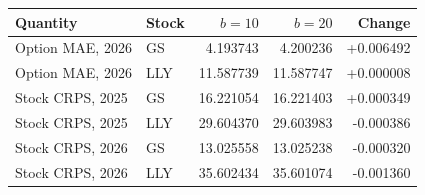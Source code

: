 \begin{tabular}{llrrr}
\toprule
Quantity & Stock & $b=10$ & $b=20$ & Change \\
\midrule
Option MAE, 2026 & GS & 4.193743 & 4.200236 & +0.006492 \\
Option MAE, 2026 & LLY & 11.587739 & 11.587747 & +0.000008 \\
Stock CRPS, 2025 & GS & 16.221054 & 16.221403 & +0.000349 \\
Stock CRPS, 2025 & LLY & 29.604370 & 29.603983 & -0.000386 \\
Stock CRPS, 2026 & GS & 13.025558 & 13.025238 & -0.000320 \\
Stock CRPS, 2026 & LLY & 35.602434 & 35.601074 & -0.001360 \\
\bottomrule\end{tabular}
